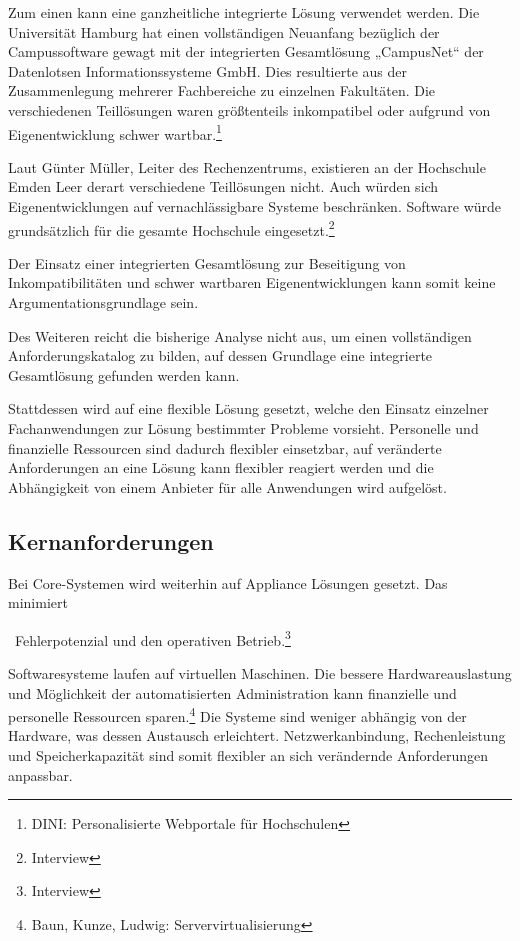\documentclass[a4paper]{article}
\begin{document}
{\sffamily
Zum einen kann eine ganzheitliche integrierte Lösung verwendet werden. Die Universität Hamburg hat einen vollständigen
Neuanfang bezüglich der Campussoftware gewagt mit der integrierten Gesamtlösung „CampusNet“ der Datenlotsen
Informationssysteme GmbH. Dies resultierte aus der Zusammenlegung mehrerer Fachbereiche zu einzelnen Fakultäten. Die
verschiedenen Teillösungen waren größtenteils inkompatibel oder aufgrund von Eigenentwicklung schwer
wartbar.\footnote{DINI: Personalisierte Webportale für Hochschulen}}

{\sffamily
Laut Günter Müller, Leiter des Rechenzentrums, existieren an der Hochschule Emden Leer derart verschiedene Teillösungen
nicht. Auch würden sich Eigenentwicklungen auf vernachlässigbare Systeme beschränken. Software würde grundsätzlich für
die gesamte Hochschule eingesetzt.\footnote{Interview}}

{\sffamily
Der Einsatz einer integrierten Gesamtlösung zur Beseitigung von Inkompatibilitäten und schwer wartbaren
Eigenentwicklungen kann somit keine Argumentationsgrundlage sein.}

{\sffamily
Des Weiteren reicht die bisherige Analyse nicht aus, um einen vollständigen Anforderungskatalog zu bilden, auf dessen
Grundlage eine integrierte Gesamtlösung gefunden werden kann. }

{\sffamily
Stattdessen wird auf eine flexible Lösung gesetzt, welche den Einsatz einzelner Fachanwendungen zur Lösung bestimmter
Probleme vorsieht. Personelle und finanzielle Ressourcen sind dadurch flexibler einsetzbar, auf veränderte
Anforderungen an eine Lösung kann flexibler reagiert werden und die Abhängigkeit von einem Anbieter für alle
Anwendungen wird aufgelöst.}

\subsection{Kernanforderungen}
{\sffamily
Bei Core-Systemen wird weiterhin auf Appliance Lösungen gesetzt. Das minimiert}

{\sffamily
\ Fehlerpotenzial und den operativen Betrieb.\footnote{Interview}}

{\sffamily
Softwaresysteme laufen auf virtuellen Maschinen. Die bessere Hardwareauslastung und Möglichkeit der automatisierten
Administration kann finanzielle und personelle Ressourcen sparen.\footnote{Baun, Kunze, Ludwig: Servervirtualisierung}
Die Systeme sind weniger abhängig von der Hardware, was dessen Austausch erleichtert. Netzwerkanbindung, Rechenleistung
und Speicherkapazität sind somit flexibler an sich verändernde Anforderungen anpassbar.}
\end{document}
